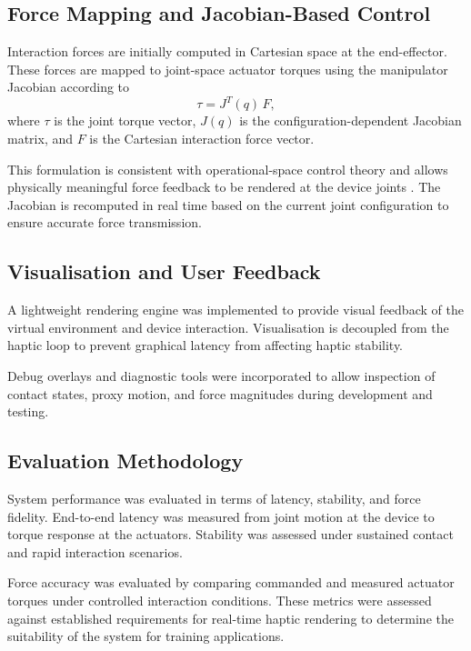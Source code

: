 \subsection{Force Mapping and Jacobian-Based Control}

Interaction forces are initially computed in Cartesian space at the end-effector. These forces are mapped to joint-space actuator torques using the manipulator Jacobian according to
\begin{equation}
	\tau = J^{T}(q)\,F,
\end{equation}
where $\tau$ is the joint torque vector, $J(q)$ is the configuration-dependent Jacobian matrix, and $F$ is the Cartesian interaction force vector.

This formulation is consistent with operational-space control theory and allows physically meaningful force feedback to be rendered at the device joints \cite{768179}. The Jacobian is recomputed in real time based on the current joint configuration to ensure accurate force transmission.

\subsection{Visualisation and User Feedback}

A lightweight rendering engine was implemented to provide visual feedback of the virtual environment and device interaction. Visualisation is decoupled from the haptic loop to prevent graphical latency from affecting haptic stability.

Debug overlays and diagnostic tools were incorporated to allow inspection of contact states, proxy motion, and force magnitudes during development and testing.

\subsection{Evaluation Methodology}

System performance was evaluated in terms of latency, stability, and force fidelity. End-to-end latency was measured from joint motion at the device to torque response at the actuators. Stability was assessed under sustained contact and rapid interaction scenarios.

Force accuracy was evaluated by comparing commanded and measured actuator torques under controlled interaction conditions. These metrics were assessed against established requirements for real-time haptic rendering to determine the suitability of the system for training applications.
